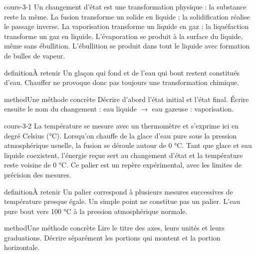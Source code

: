 \documentclass[12pt,twoside,openany]{book}
\begin{document}
\label{ch-3-cours-1}
\label{ess-3}
\begin{pcFiche}{cours-3-1}
Un changement d’état est une transformation physique : la substance reste la même. La fusion transforme un solide en liquide ; la solidification réalise le passage inverse. La vaporisation transforme un liquide en gaz ; la liquéfaction transforme un gaz en liquide. L’évaporation se produit à la surface du liquide, même sans ébullition. L’ébullition se produit dans tout le liquide avec formation de bulles de vapeur.\par
{}
\begin{pcEncadre}{definition}{À retenir}
Un glaçon qui fond et de l’eau qui bout restent constitués d’eau. Chauffer ne provoque donc pas toujours une transformation chimique.\par
\end{pcEncadre}
\begin{pcEncadre}{method}{Une méthode concrète}
Décrire d’abord l’état initial et l’état final. Écrire ensuite le nom du changement : eau liquide \(\rightarrow\) eau gazeuse : vaporisation.\par
\end{pcEncadre}
\end{pcFiche}
\label{ch-3-cours-2}
\begin{pcFiche}{cours-3-2}
La température se mesure avec un thermomètre et s’exprime ici en degré Celsius (°C). Lorsqu’on chauffe de la glace d’eau pure sous la pression atmosphérique usuelle, la fusion se déroule autour de 0 °C. Tant que glace et eau liquide coexistent, l’énergie reçue sert au changement d’état et la température reste voisine de 0 °C. Ce palier est un repère expérimental, avec les limites de précision des mesures.\par
{}
\begin{pcEncadre}{definition}{À retenir}
Un palier correspond à plusieurs mesures successives de température presque égale. Un simple point ne constitue pas un palier. L’eau pure bout vers 100 °C à la pression atmosphérique normale.\par
\end{pcEncadre}
\begin{pcEncadre}{method}{Une méthode concrète}
Lire le titre des axes, leurs unités et leurs graduations. Décrire séparément les portions qui montent et la portion horizontale.\par
\end{pcEncadre}
\end{pcFiche}
\end{document}
